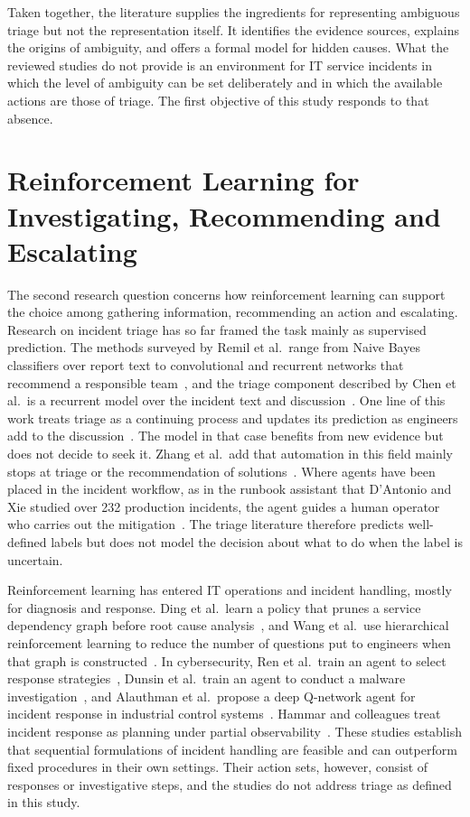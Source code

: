 \documentclass[12pt,a4paper]{article}
\begin{document}
Taken together, the literature supplies the ingredients for representing ambiguous triage but not the representation itself. It identifies the evidence sources, explains the origins of ambiguity, and offers a formal model for hidden causes. What the reviewed studies do not provide is an environment for IT service incidents in which the level of ambiguity can be set deliberately and in which the available actions are those of triage. The first objective of this study responds to that absence.

\section{Reinforcement Learning for Investigating, Recommending and Escalating}

The second research question concerns how reinforcement learning can support the choice among gathering information, recommending an action and escalating. Research on incident triage has so far framed the task mainly as supervised prediction. The methods surveyed by Remil et al.\ range from Naive Bayes classifiers over report text to convolutional and recurrent networks that recommend a responsible team~\cite{remil2024}, and the triage component described by Chen et al.\ is a recurrent model over the incident text and discussion~\cite{chen2020}. One line of this work treats triage as a continuing process and updates its prediction as engineers add to the discussion~\cite{remil2024,chen2020}. The model in that case benefits from new evidence but does not decide to seek it. Zhang et al.\ add that automation in this field mainly stops at triage or the recommendation of solutions~\cite{zhang2025}. Where agents have been placed in the incident workflow, as in the runbook assistant that D'Antonio and Xie studied over 232 production incidents, the agent guides a human operator who carries out the mitigation~\cite{dantonio2025}. The triage literature therefore predicts well-defined labels but does not model the decision about what to do when the label is uncertain.

Reinforcement learning has entered IT operations and incident handling, mostly for diagnosis and response. Ding et al.\ learn a policy that prunes a service dependency graph before root cause analysis~\cite{ding2023}, and Wang et al.\ use hierarchical reinforcement learning to reduce the number of questions put to engineers when that graph is constructed~\cite{wang2023hrlhf}. In cybersecurity, Ren et al.\ train an agent to select response strategies~\cite{ren2025}, Dunsin et al.\ train an agent to conduct a malware investigation~\cite{dunsin2025}, and Alauthman et al.\ propose a deep Q-network agent for incident response in industrial control systems~\cite{alauthman2026}. Hammar and colleagues treat incident response as planning under partial observability~\cite{hammar2025,hammar2026belief}. These studies establish that sequential formulations of incident handling are feasible and can outperform fixed procedures in their own settings. Their action sets, however, consist of responses or investigative steps, and the studies do not address triage as defined in this study.
\end{document}
